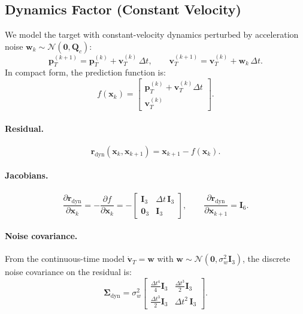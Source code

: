 \documentclass[11pt,a4paper]{article}
\newcommand{\state}{\bm{x}}
\newcommand{\resid}{\bm{r}}
\newcommand{\eye}{\bm{I}}
\newcommand{\cov}{\bm{\Sigma}}
\begin{document}
\subsection{Dynamics Factor (Constant Velocity)}
\label{sec:dynamics}

We model the target with constant-velocity dynamics perturbed by
acceleration noise $\bm{w}_k \sim \mathcal{N}(\bm{0}, \bm{Q}_c)$:
\begin{equation}
  \bm{p}_T^{(k+1)} = \bm{p}_T^{(k)} + \bm{v}_T^{(k)}\,\Delta t,
  \qquad
  \bm{v}_T^{(k+1)} = \bm{v}_T^{(k)} + \bm{w}_k\,\Delta t.
  \label{eq:cv_model}
\end{equation}
In compact form, the prediction function is:
\begin{equation}
  f(\state_k) = \begin{bmatrix} \bm{p}_T^{(k)} + \bm{v}_T^{(k)}\Delta t \\
                                 \bm{v}_T^{(k)} \end{bmatrix}.
\end{equation}

\paragraph{Residual.}
\begin{equation}
  \resid_{\text{dyn}}(\state_k, \state_{k+1})
  = \state_{k+1} - f(\state_k).
\end{equation}

\paragraph{Jacobians.}
\begin{equation}
  \frac{\partial \resid_{\text{dyn}}}{\partial \state_k}
  = -\frac{\partial f}{\partial \state_k}
  = -\begin{bmatrix} \eye_3 & \Delta t\,\eye_3 \\
                      \bm{0}_3 & \eye_3 \end{bmatrix},
  \qquad
  \frac{\partial \resid_{\text{dyn}}}{\partial \state_{k+1}}
  = \eye_6.
  \label{eq:dyn_jac}
\end{equation}

\paragraph{Noise covariance.}
From the continuous-time model $\dot{\bm{v}}_T = \bm{w}$ with
$\bm{w} \sim \mathcal{N}(\bm{0}, \sigma_w^2 \eye_3)$, the discrete
noise covariance on the residual is:
\begin{equation}
  \cov_{\text{dyn}} = \sigma_w^2
  \begin{bmatrix}
    \frac{\Delta t^4}{4}\eye_3 & \frac{\Delta t^3}{2}\eye_3 \\[4pt]
    \frac{\Delta t^3}{2}\eye_3 & \Delta t^2\,\eye_3
  \end{bmatrix}.
  \label{eq:dyn_cov}
\end{equation}
\end{document}
